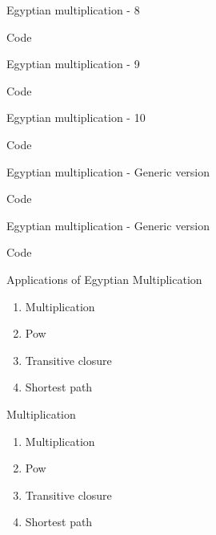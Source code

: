 \documentclass[10pt]{beamer}
\begin{document}
\begin{frame}[fragile]{Egyptian multiplication - 8}
\begin{block}{Code}\end{block}
\end{frame}

\begin{frame}[fragile]{Egyptian multiplication - 9}
\begin{block}{Code}\end{block}
\end{frame}

\begin{frame}[fragile]{Egyptian multiplication - 10}
\begin{block}{Code}\end{block}
\end{frame}

\begin{frame}[fragile]{Egyptian multiplication - Generic version}
\begin{block}{Code}\end{block}
\end{frame}

\begin{frame}[fragile]{Egyptian multiplication - Generic version}
\begin{block}{Code}\end{block}
\end{frame}

\begin{frame}[fragile]{Applications of Egyptian Multiplication}
  \begin{enumerate}
    \item Multiplication
    \item Pow
    \item Transitive closure
    \item Shortest path
  \end{enumerate}
\end{frame}

\begin{frame}[fragile]{Multiplication}
  \begin{enumerate}
    \item Multiplication
    \item Pow
    \item Transitive closure
    \item Shortest path
  \end{enumerate}
\end{frame}
\end{document}
